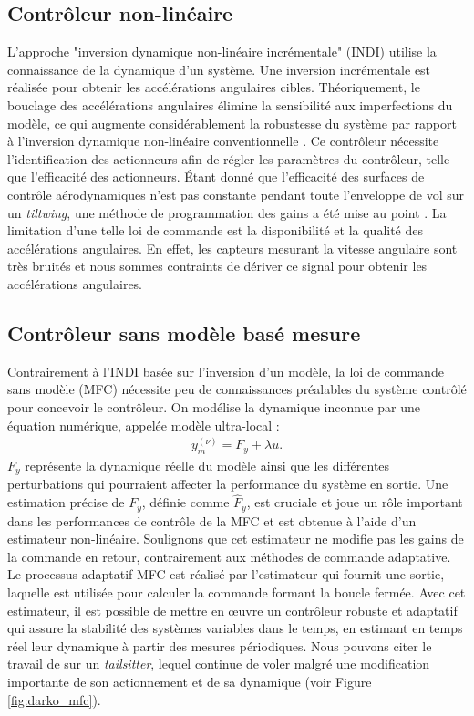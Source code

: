 \subsection*{Contrôleur non-linéaire}

L'approche "inversion dynamique non-linéaire incrémentale" (INDI) utilise la connaissance de la dynamique d'un système. Une inversion incrémentale est réalisée pour obtenir les accélérations angulaires cibles. Théoriquement, le bouclage des accélérations angulaires élimine la sensibilité aux imperfections du modèle, ce qui augmente considérablement la robustesse du système par rapport à l'inversion dynamique non-linéaire conventionnelle \cite{Sieberling2010, Binz2019}. Ce contrôleur nécessite l'identification des actionneurs afin de régler les paramètres du contrôleur, telle que l'efficacité des actionneurs. Étant donné que l'efficacité des surfaces de contrôle aérodynamiques n'est pas constante pendant toute l'enveloppe de vol sur un \textit{tiltwing}, une méthode de programmation des gains a été mise au point \cite{smeurINDI,smeurINDITail}.
La limitation d'une telle loi de commande est la disponibilité et la qualité  des accélérations angulaires. En effet, les capteurs mesurant la vitesse angulaire sont très bruités et nous sommes contraints de dériver ce signal pour obtenir les accélérations angulaires.



\subsection*{Contrôleur sans modèle basé mesure}

Contrairement à l'INDI basée sur l'inversion d'un modèle, la loi de commande sans modèle (MFC) \cite{Fliess_2013}  nécessite peu de connaissances préalables du système contrôlé pour concevoir le contrôleur.
On modélise la dynamique inconnue par une équation numérique, appelée modèle ultra-local :
\begin{align}
    y_{m}^{(\nu)} = F_{y} + \lambda u.
\end{align}
$F_{y}$ représente la dynamique réelle du modèle ainsi que les différentes perturbations qui pourraient affecter la performance du système en sortie. Une estimation précise de $F_{y}$, définie comme $\hat{F}_{y}$, est cruciale et joue un rôle important dans les performances de contrôle de la MFC et est obtenue à l'aide d'un estimateur non-linéaire. Soulignons que cet estimateur ne modifie pas les gains de la commande en retour, contrairement aux méthodes de commande adaptative. Le processus adaptatif MFC est réalisé par l'estimateur qui fournit une sortie, laquelle est utilisée pour calculer la commande formant la boucle fermée. Avec cet estimateur, il est possible de mettre en œuvre un contrôleur robuste et adaptatif qui assure la stabilité des systèmes variables dans le temps, en estimant en temps réel leur dynamique à partir des mesures périodiques. Nous pouvons citer le travail de \cite{olszaneckibarthHal-02542982} sur un \textit{tailsitter}, lequel continue de voler malgré une modification importante de son actionnement et de sa dynamique (voir Figure \ref{fig:darko_mfc}).

